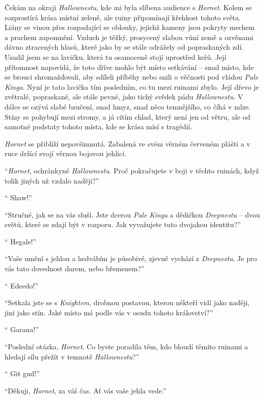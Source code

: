 \documentclass[11pt]{article}
\begin{document}
Čekám na okraji \textit{Hallownestu}, kde mi byla slíbena audience s \textit{Hornet}.
Kolem se rozprostírá krása místní zeleně, ale ruiny připomínají křehkost tohoto světa.
Liány se vinou přes rozpadající se oblouky, jejichž kameny jsou pokryty mechem a prachem zapomnění.
Vzduch je těžký, prosycený slabou vůní země a ozvěnami dávno ztracených hlasů, které jako by se stále odrážely od popraskaných zdí.
Usadil jsem se na lavičku, která tu osamoceně stojí uprostřed keřů.
Její přítomnost napovídá, že toto dříve mohlo být místo setkávání -- snad místo, kde se brouci shromažďovali, aby sdíleli příběhy nebo snili o věčnosti pod vládou \textit{Pale Kinga}.
Nyní je tato lavička tím posledním, co tu mezi ruinami zbylo. Její dřevo je zvětralé, popraskané, ale stále pevné, jako tichý svědek pádu \textit{Hallownestu}.
V dálce se ozývá slabé bzučení, snad hmyz, snad něco temnějšího, co číhá v mlze.
Stíny se pohybují mezi stromy, a já cítím chlad, který není jen od větru, ale od samotné podstaty tohoto místa, kde se krása mísí s tragédií.\par
\textit{Hornet} se přiblíží nepovšimnutá.
Zabalená ve svém věrném červeném plášti a v ruce držící svojí věrnou bojovou jehlici.\par
\enquote{\textit{Hornet}, ochránkyně \textit{Hallownestu}. Proč pokračujete v boji v těchto ruinách, když tolik jiných už vzdalo naději?}\par
\enquote{{ Shaw!}}\par
\enquote{Stručné, jak se na vás sluší. Jste dcerou \textit{Pale Kinga} a dědičkou \textit{Deepnestu} -- dvou světů, které se zdají být v rozporu. Jak vyvažujete tuto dvojakou identitu?}\par
\enquote{{ Hegale!}}\par
\enquote{Vaše umění s jehlou a hedvábím je působivé, zjevně vychází z \textit{Deepnestu}. Je pro vás tato dovednost darem, nebo břemenem?}\par
\enquote{{ Edeedo!}}\par
\enquote{Setkala jste se s \textit{Knightem}, drobnou postavou, kterou někteří vidí jako naději, jiní jako stín. Jaké místo má podle vás v osudu tohoto království?}\par
\enquote{{ Garana!}}\par
\enquote{Poslední otázka, \textit{Hornet}. Co byste poradila těm, kdo bloudí těmito ruinami a hledají sílu přežít v temnotě \textit{Hallownestu}?}\par
\enquote{{ Git gud!}}\par
\enquote{Děkuji, \textit{Hornet}, za váš čas. Ať vás vaše jehla vede.}
\end{document}

